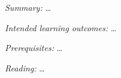
\emph{Summary:}
\dots

\emph{Intended learning outcomes:}
\dots

\emph{Prerequisites:}
\dots

\emph{Reading:}
\dots
